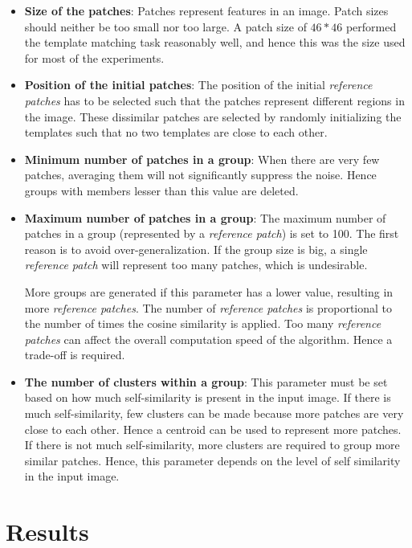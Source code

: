 \documentclass[fleqn,10pt]{wlscirep}
\begin{document}
\begin{itemize}
	\item \textbf{Size of the patches}: Patches represent features in an image. Patch sizes should neither be too small nor too large. A patch size of $46*46$ performed the template matching task reasonably well, and hence this was the size used for most of the experiments. 
	
	\item \textbf{Position of the initial patches}: The position of the initial \textit{reference patches} has to be selected such that the patches represent different regions in the image. These dissimilar patches are selected by randomly initializing the templates such that no two templates are close to each other.
	
	\item \textbf{Minimum number of patches in a group}:  When there are very few patches, averaging them will not significantly suppress the noise. Hence groups with members lesser than this value are deleted.
	
	\item \textbf{Maximum number of patches in a group}: The maximum number of patches in a group (represented by a \textit{reference patch}) is set to 100. The first reason is to avoid over-generalization. If the group size is big, a single \textit{reference patch} will represent too many patches, which is undesirable. 
	
	More groups are generated if this parameter has a lower value, resulting in more \textit{reference patches}. The number of \textit{reference patches} is proportional to the number of times the cosine similarity is applied. Too many \textit{reference patches} can affect the overall computation speed of the algorithm. Hence a trade-off is required.
	
	\item \textbf{The number of clusters within a group}: This parameter must be set based on how much self-similarity is present in the input image. If there is much self-similarity, few clusters can be made because more patches are very close to each other. Hence a centroid can be used to represent more patches. If there is not much self-similarity, more clusters are required to group more similar patches. Hence, this parameter depends on the level of self similarity in the input image. 

\end{itemize}

\section*{Results}
\end{document}
